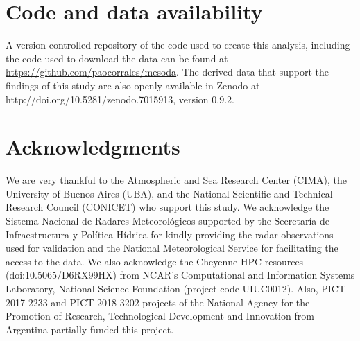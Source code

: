 \documentclass[final,5p,times,twocolumn,authoryear]{elsarticle} %
\begin{document}
\hypertarget{code-and-data-availability}{%
\section{Code and data availability}\label{code-and-data-availability}}

A version-controlled repository of the code used to create this analysis, including the code used to download the data can be found at \url{https://github.com/paocorrales/mesoda}. The derived data that support the findings of this study are also openly available in Zenodo at http://doi.org/10.5281/zenodo.7015913, version 0.9.2.

\hypertarget{acknowledgments}{%
\section*{Acknowledgments}\label{acknowledgments}}

We are very thankful to the Atmospheric and Sea Research Center (CIMA), the University of Buenos Aires (UBA), and the National Scientific and Technical Research Council (CONICET) who support this study. We acknowledge the Sistema Nacional de Radares Meteorológicos supported by the Secretaría de Infraestructura y Política Hídrica for kindly providing the radar observations used for validation and the National Meteorological Service for facilitating the access to the data. We also acknowledge the Cheyenne HPC resources (doi:10.5065/D6RX99HX) from NCAR's Computational and Information Systems Laboratory, National Science Foundation (project code UIUC0012). Also, PICT 2017-2233 and PICT 2018-3202 projects of the National Agency for the Promotion of Research, Technological Development and Innovation from Argentina partially funded this project.

\renewcommand\refname{References}

\end{document}

